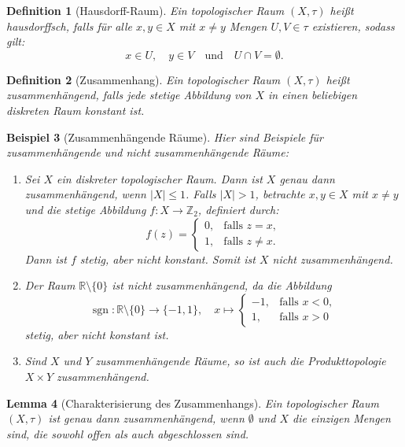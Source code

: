 \documentclass[a4paper,12pt]{article}
\theoremstyle{break}
\newtheorem{definition}{Definition}[section]
\newtheorem{example}[definition]{Beispiel}
\newtheorem{lemma}[definition]{Lemma}
\begin{document}
\begin{definition}[Hausdorff-Raum]
Ein topologischer Raum $(X, \tau)$ heißt \emph{hausdorffsch}, falls für alle $x, y \in X$ mit $x \neq y$ Mengen $U, V \in \tau$ existieren, sodass gilt:
\[
x \in U, \quad y \in V \quad \text{und} \quad U \cap V = \emptyset.
\]
\end{definition}

\begin{definition}[Zusammenhang]
Ein topologischer Raum $(X, \tau)$ heißt \emph{zusammenhängend}, falls jede stetige Abbildung von $X$ in einen beliebigen diskreten Raum konstant ist.
\end{definition}

\begin{example}[Zusammenhängende Räume]
Hier sind Beispiele für zusammenhängende und nicht zusammenhängende Räume:
\begin{enumerate}
    \item Sei $X$ ein diskreter topologischer Raum. Dann ist $X$ genau dann zusammenhängend, wenn $|X| \leq 1$. Falls $|X| > 1$, betrachte $x, y \in X$ mit $x \neq y$ und die stetige Abbildung $f: X \to \mathbb{Z}_2$, definiert durch:
    \[
    f(z) = 
    \begin{cases} 
        0, & \text{falls } z = x, \\ 
        1, & \text{falls } z \neq x.
    \end{cases}
    \]
    Dann ist $f$ stetig, aber nicht konstant. Somit ist $X$ nicht zusammenhängend.

    \item Der Raum $\mathbb{R} \setminus \{0\}$ ist nicht zusammenhängend, da die Abbildung
    \[
    \operatorname{sgn}: \mathbb{R} \setminus \{0\} \to \{-1, 1\}, \quad x \mapsto 
    \begin{cases} 
        -1, & \text{falls } x < 0, \\ 
        1, & \text{falls } x > 0
    \end{cases}
    \]
    stetig, aber nicht konstant ist.

    \item Sind $X$ und $Y$ zusammenhängende Räume, so ist auch die Produkttopologie $X \times Y$ zusammenhängend.
\end{enumerate}
\end{example}

\begin{lemma}[Charakterisierung des Zusammenhangs]
Ein topologischer Raum $(X, \tau)$ ist genau dann \emph{zusammenhängend}, wenn $\emptyset$ und $X$ die einzigen Mengen sind, die sowohl offen als auch abgeschlossen sind.
\end{lemma}
\end{document}
